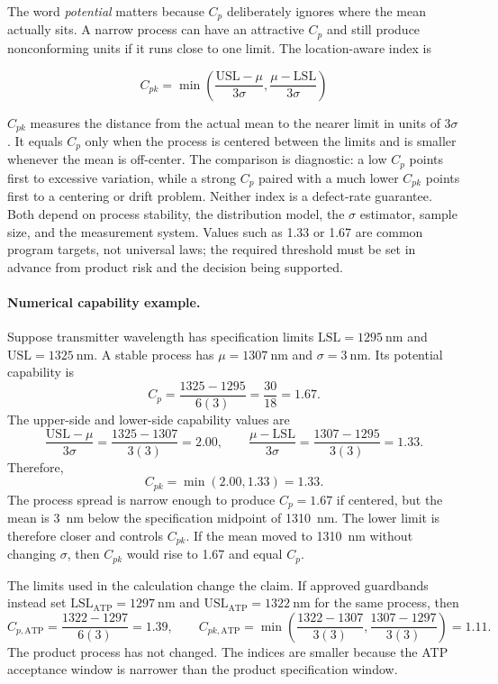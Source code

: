 The word \emph{potential} matters because $C_p$ deliberately ignores where the
mean actually sits. A narrow process can have an attractive $C_p$ and still
produce nonconforming units if it runs close to one limit. The location-aware
index is

\begin{equation}
C_{pk}=
\min\left(
\frac{\mathrm{USL}-\mu}{3\sigma},
\frac{\mu-\mathrm{LSL}}{3\sigma}
\right)
\end{equation}

$C_{pk}$ measures the distance from the actual mean to the nearer limit in
units of $3\sigma$. It equals $C_p$ only when the process is centered between
the limits and is smaller whenever the mean is off-center. The comparison is
diagnostic: a low $C_p$ points first to excessive variation, while a strong
$C_p$ paired with a much lower $C_{pk}$ points first to a centering or drift
problem. Neither index is a defect-rate guarantee. Both depend on process
stability, the distribution model, the $\sigma$ estimator, sample size, and the
measurement system. Values such as 1.33 or 1.67 are common program targets, not
universal laws; the required threshold must be set in advance from product risk
and the decision being supported.

\paragraph{Numerical capability example.}
Suppose transmitter wavelength has specification limits
$\mathrm{LSL}=1295~\mathrm{nm}$ and
$\mathrm{USL}=1325~\mathrm{nm}$. A stable process has
$\mu=1307~\mathrm{nm}$ and $\sigma=3~\mathrm{nm}$. Its potential capability is
\[
C_p=\frac{1325-1295}{6(3)}
   =\frac{30}{18}
   =1.67.
\]
The upper-side and lower-side capability values are
\[
\frac{\mathrm{USL}-\mu}{3\sigma}
=\frac{1325-1307}{3(3)}
=2.00,
\qquad
\frac{\mu-\mathrm{LSL}}{3\sigma}
=\frac{1307-1295}{3(3)}
=1.33.
\]
Therefore,
\[
C_{pk}=\min(2.00,1.33)=1.33.
\]
The process spread is narrow enough to produce $C_p=1.67$ if centered, but the
mean is 3~nm below the specification midpoint of 1310~nm. The lower limit is
therefore closer and controls $C_{pk}$. If the mean moved to 1310~nm without
changing $\sigma$, then $C_{pk}$ would rise to 1.67 and equal $C_p$.

The limits used in the calculation change the claim. If approved guardbands
instead set $\mathrm{LSL}_{\mathrm{ATP}}=1297~\mathrm{nm}$ and
$\mathrm{USL}_{\mathrm{ATP}}=1322~\mathrm{nm}$ for the same process, then
\[
C_{p,\mathrm{ATP}}=\frac{1322-1297}{6(3)}=1.39,
\qquad
C_{pk,\mathrm{ATP}}=
\min\left(\frac{1322-1307}{3(3)},
          \frac{1307-1297}{3(3)}\right)=1.11.
\]
The product process has not changed. The indices are smaller because the ATP
acceptance window is narrower than the product specification window.

